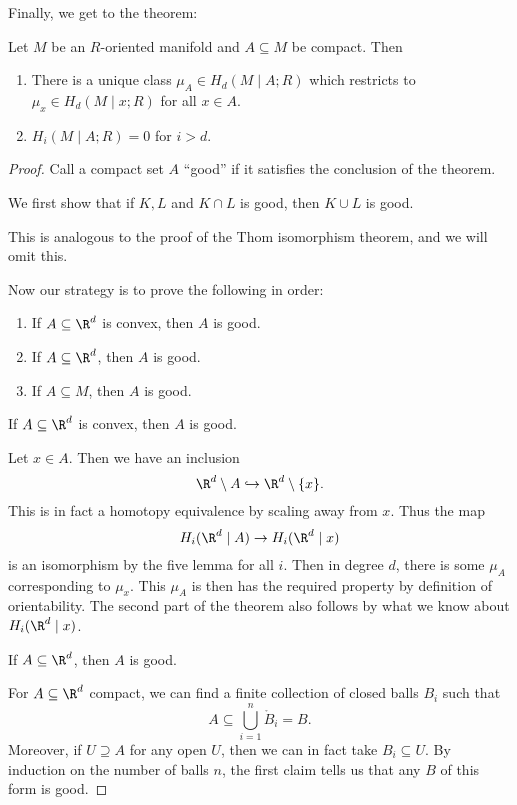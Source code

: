 \documentclass[a4paper]{article}
\theoremstyle{definition}
\begin{document}
Finally, we get to the theorem:
\begin{thm}
  Let $M$ be an $R$-oriented manifold and $A \subseteq M$ be compact. Then
  \begin{enumerate}
    \item There is a unique class $\mu_A \in H_d(M \mid A; R)$ which restricts to $\mu_x \in H_d(M \mid x; R)$ for all $x \in A$.
    \item $H_i(M\mid A; R) = 0$ for $i > d$.
  \end{enumerate}
\end{thm}

\begin{proof}
  Call a compact set $A$ ``good'' if it satisfies the conclusion of the theorem.

  \begin{claim}
    We first show that if $K, L$ and $K \cap L$ is good, then $K \cup L$ is good.
  \end{claim}
  This is analogous to the proof of the Thom isomorphism theorem, and we will omit this.

  Now our strategy is to prove the following in order:
  \begin{enumerate}
    \item If $A \subseteq \R^d$ is convex, then $A$ is good.
    \item If $A \subseteq \R^d$, then $A$ is good.
    \item If $A \subseteq M$, then $A$ is good.
  \end{enumerate}

  \begin{claim}
    If $A \subseteq \R^d$ is convex, then $A$ is good.
  \end{claim}
  Let $x \in A$. Then we have an inclusion
  \[
    \R^d \setminus A \hookrightarrow \R^d \setminus \{x\}.
  \]
  This is in fact a homotopy equivalence by scaling away from $x$. Thus the map
  \[
    H_i(\R^d \mid A) \to H_i(\R^d \mid x)
  \]
  is an isomorphism by the five lemma for all $i$. Then in degree $d$, there is some $\mu_A$ corresponding to $\mu_x$. This $\mu_A$ is then has the required property by definition of orientability. The second part of the theorem also follows by what we know about $H_i(\R^d \mid x)$.

  \begin{claim}
    If $A \subseteq \R^d$, then $A$ is good.
  \end{claim}
  For $A \subseteq \R^d$ compact, we can find a finite collection of closed balls $B_i$ such that
  \[
    A \subseteq \bigcup_{i = 1}^n \mathring{B}_i = B.
  \]
  Moreover, if $U \supseteq A$ for any open $U$, then we can in fact take $B_i \subseteq U$. By induction on the number of balls $n$, the first claim tells us that any $B$ of this form is good.


\end{proof}
\end{document}
